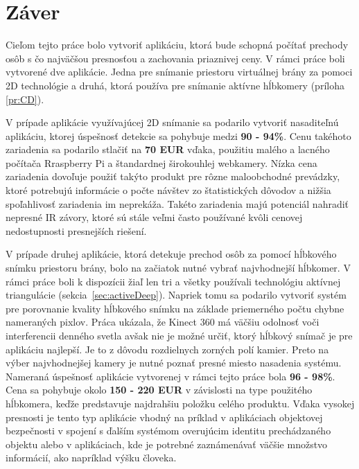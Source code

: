 
\chapter{Záver}
Cieľom tejto práce bolo vytvoriť aplikáciu, ktorá bude schopná počítať prechody osôb s čo najväčšou presnosťou a zachovania priaznivej ceny. V rámci práce boli vytvorené dve aplikácie. Jedna pre snímanie priestoru virtuálnej brány za pomoci 2D technológie a druhá, ktorá používa pre snímanie aktívne hĺbkomery (príloha \ref{pr:CD}).

V prípade aplikácie využívajúcej 2D snímanie sa podarilo vytvoriť nasaditeľnú aplikáciu, ktorej úspešnosť detekcie sa pohybuje medzi \textbf{90 - 94\%}. Cenu takéhoto zariadenia sa podarilo stlačiť na \textbf{70 EUR} vďaka, použitiu malého a lacného počítača Rraspberry Pi a štandardnej širokouhlej webkamery. Nízka cena zariadenia dovoľuje použiť takýto produkt pre rôzne maloobchodné prevádzky, ktoré potrebujú informácie o počte návštev zo štatistických dôvodov a nižšia spoľahlivosť zariadenia im neprekáža. Takéto zariadenia majú potenciál nahradiť nepresné IR závory, ktoré sú stále veľmi často používané kvôli cenovej nedostupnosti presnejších riešení.

V prípade druhej aplikácie, ktorá detekuje prechod osôb za pomocí hĺbkového snímku priestoru brány, bolo na začiatok nutné vybrať najvhodnejší hĺbkomer. V rámci práce boli k dispozícii žiaľ len tri a všetky používali technológiu aktívnej triangulácie (sekcia~\ref{sec:activeDeep}). Napriek tomu sa podarilo vytvoriť systém pre porovnanie kvality hĺbkového snímku na základe priemerného počtu chybne nameraných pixlov. Práca ukázala, že Kinect 360 má väčšiu odolnosť voči interferencii denného svetla avšak nie je možné určiť, ktorý hĺbkový snímač je pre aplikáciu najlepší. Je to z dôvodu rozdielnych zorných polí kamier. Preto na výber najvhodnejšej kamery je nutné poznať presné miesto nasadenia systému. Nameraná úspešnosť aplikácie vytvorenej v rámci tejto práce bola \textbf{96 - 98\%}. Cena sa pohybuje okolo \textbf{150 - 220 EUR} v závislosti na type použitého hĺbkomera, keďže predstavuje najdrahšiu položku celého produktu. Vďaka vysokej presnosti je tento typ aplikácie vhodný na príklad v aplikáciach objektovej bezpečnosti v spojení s ďalším systémom overujúcim identitu prechádzaného objektu alebo v aplikáciach, kde je potrebné zaznámenávať väčšie množstvo informácií, ako napríklad výšku človeka.

